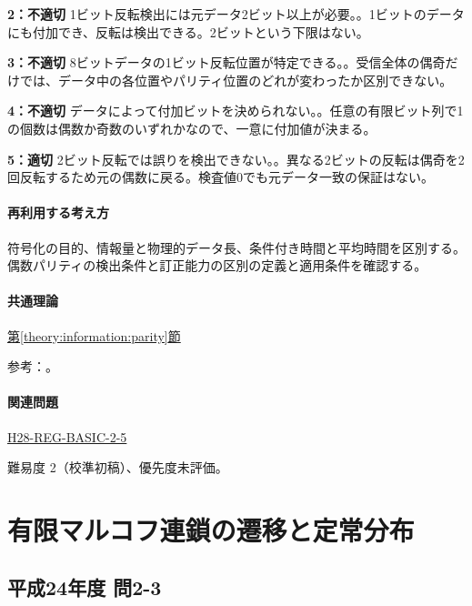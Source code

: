 \noindent\textbf{2：不適切} 1ビット反転検出には元データ2ビット以上が必要。。1ビットのデータにも付加でき、反転は検出できる。2ビットという下限はない。\par

\noindent\textbf{3：不適切} 8ビットデータの1ビット反転位置が特定できる。。受信全体の偶奇だけでは、データ中の各位置やパリティ位置のどれが変わったか区別できない。\par

\noindent\textbf{4：不適切} データによって付加ビットを決められない。。任意の有限ビット列で1の個数は偶数か奇数のいずれかなので、一意に付加値が決まる。\par

\noindent\textbf{5：適切} 2ビット反転では誤りを検出できない。。異なる2ビットの反転は偶奇を2回反転するため元の偶数に戻る。検査値0でも元データ一致の保証はない。\par

\paragraph{再利用する考え方} 符号化の目的、情報量と物理的データ長、条件付き時間と平均時間を区別する。偶数パリティの検出条件と訂正能力の区別の定義と適用条件を確認する。

\paragraph{共通理論} \hyperref[theory:information:parity]{第\ref*{theory:information:parity}節}

\par 参考：\cite{info_errors}。

\paragraph{関連問題} \hyperref[q:h28-reg-basic-2-5]{H28-REG-BASIC-2-5}

\par 難易度 2（校準初稿）、優先度未評価。

\section{有限マルコフ連鎖の遷移と定常分布}

\subsection{平成24年度 問2-3}
\label{q:h24-reg-basic-2-3}

